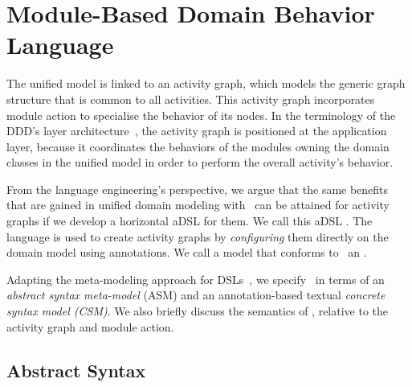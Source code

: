 %
\section{Module-Based Domain Behavior Language}\label{sect:agl} %
The unified model is linked to an activity graph, which models the generic graph structure that is common to all activities. This activity graph incorporates module action to specialise the behavior of its nodes.
In the terminology of the DDD's layer architecture~\cite{evans_domain-driven_2004}, the activity graph is positioned at the application layer, because it coordinates the behaviors of the modules owning the domain classes in the unified model in order to perform the overall activity's behavior.

From the language engineering's perspective, we argue that the same benefits that are gained in unified domain modeling with \dcsl~can be attained for activity graphs if we develop a horizontal aDSL for them. We call this aDSL .
The language is used to create activity graphs by \textit{configuring} them directly on the domain model using annotations. We call a model that conforms to \agl~an .

Adapting the meta-modeling approach for DSLs~\cite{kleppe_software_2008}, we specify \agl~in terms of an \textit{abstract syntax meta-model} (ASM) and an annotation-based textual \textit{concrete syntax model (CSM)}. We also briefly discuss the semantics of \agl, relative to the activity graph and module action.
%
\subsection{Abstract Syntax} \label{sect:agl-abstractSyntax}

